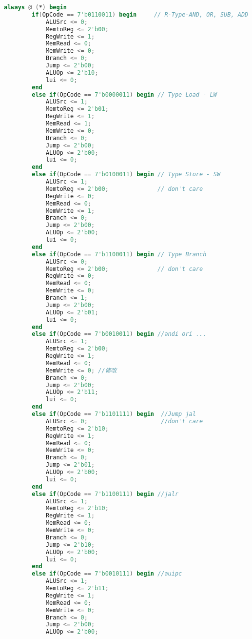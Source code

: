 \begin{lstlisting}[language = {verilog}]
    always @ (*) begin
        if(OpCode == 7'b0110011) begin     // R-Type-AND, OR, SUB, ADD
            ALUSrc <= 0;
            MemtoReg <= 2'b00;
            RegWrite <= 1;
            MemRead <= 0;
            MemWrite <= 0;
            Branch <= 0;
            Jump <= 2'b00;
            ALUOp <= 2'b10;
            lui <= 0;
        end
        else if(OpCode == 7'b0000011) begin // Type Load - LW
            ALUSrc <= 1;
            MemtoReg <= 2'b01;
            RegWrite <= 1;
            MemRead <= 1;
            MemWrite <= 0;
            Branch <= 0;
            Jump <= 2'b00;
            ALUOp <= 2'b00;
            lui <= 0;
        end
        else if(OpCode == 7'b0100011) begin // Type Store - SW
            ALUSrc <= 1;
            MemtoReg <= 2'b00;              // don't care
            RegWrite <= 0;
            MemRead <= 0;
            MemWrite <= 1;
            Branch <= 0;
            Jump <= 2'b00;
            ALUOp <= 2'b00;
            lui <= 0;
        end
        else if(OpCode == 7'b1100011) begin // Type Branch
            ALUSrc <= 0;
            MemtoReg <= 2'b00;              // don't care
            RegWrite <= 0;
            MemRead <= 0;
            MemWrite <= 0;
            Branch <= 1;
            Jump <= 2'b00;
            ALUOp <= 2'b01;
            lui <= 0;
        end
        else if(OpCode == 7'b0010011) begin //andi ori ...
            ALUSrc <= 1;               
            MemtoReg <= 2'b00;
            RegWrite <= 1;
            MemRead <= 0;
            MemWrite <= 0; //修改
            Branch <= 0;
            Jump <= 2'b00;
            ALUOp <= 2'b11;    
            lui <= 0;     
        end
        else if(OpCode == 7'b1101111) begin  //Jump jal
            ALUSrc <= 0;                     //don't care
            MemtoReg <= 2'b10;
            RegWrite <= 1;
            MemRead <= 0;
            MemWrite <= 0;
            Branch <= 0;
            Jump <= 2'b01;
            ALUOp <= 2'b00;               
            lui <= 0;
        end
        else if(OpCode == 7'b1100111) begin //jalr
            ALUSrc <= 1;
            MemtoReg <= 2'b10;
            RegWrite <= 1;
            MemRead <= 0;
            MemWrite <= 0;
            Branch <= 0;
            Jump <= 2'b10;
            ALUOp <= 2'b00;
            lui <= 0;
        end
        else if(OpCode == 7'b0010111) begin //auipc
            ALUSrc <= 1;                      
            MemtoReg <= 2'b11; 
            RegWrite <= 1;
            MemRead <= 0;
            MemWrite <= 0;
            Branch <= 0;
            Jump <= 2'b00;
            ALUOp <= 2'b00;

\end{lstlisting}
